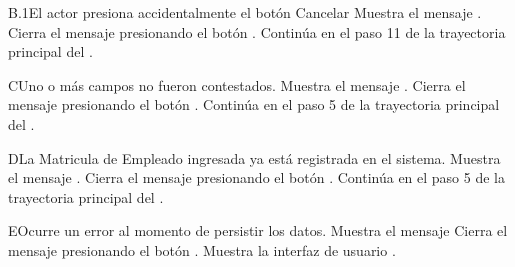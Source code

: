 
\begin{UCtrayectoriaA}{B.1}{El actor presiona accidentalmente el botón Cancelar}
    \UCpaso Muestra el mensaje .
    \UCpaso[\UCactor] Cierra el mensaje presionando el botón .
    \UCpaso Continúa en el paso 11 de la trayectoria principal del .
\end{UCtrayectoriaA}


\begin{UCtrayectoriaA}{C}{Uno o más campos no fueron contestados.}
    \UCpaso Muestra el mensaje .
    \UCpaso[\UCactor] Cierra el mensaje presionando el botón .
    \UCpaso Continúa en el paso 5 de la trayectoria principal del .
\end{UCtrayectoriaA}


\begin{UCtrayectoriaA}{D}{La Matricula de Empleado ingresada ya está registrada en el sistema.}
    \UCpaso Muestra el mensaje .
    \UCpaso[\UCactor] Cierra el mensaje presionando el botón .
    \UCpaso Continúa en el paso 5 de la trayectoria principal del .
\end{UCtrayectoriaA}


\begin{UCtrayectoriaA}{E}{Ocurre un error al momento de persistir los datos.}
    \UCpaso Muestra el mensaje 
    \UCpaso[\UCactor] Cierra el mensaje presionando el botón .
    \UCpaso Muestra la interfaz de usuario .
\end{UCtrayectoriaA}